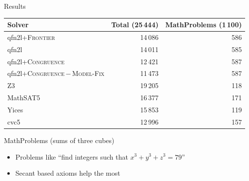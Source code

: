 \documentclass[11pt]{beamer}
\newcommand{\solver}{\textsf{qfn2l}}
\begin{document}
\begin{frame}{Results}
	\begin{center}
		\footnotesize
		\renewcommand{\arraystretch}{1.15}
		\begin{tabular}{lrr}
			\toprule
			\textbf{Solver}               & \textbf{Total} (25\,444) & \textbf{MathProblems} (1\,100) \\
			\midrule
			{\solver{}+\textsc{Frontier}} & {14\,086}                & {586}                          \\
			{\solver}                     & {14\,011}                & {585}                          \\
			{\solver{}+\textsc{Congruence}}   & {12\,421}                & {587}                          \\
			{\solver{}$+$\textsc{Congruence}\,$-$\,\textsc{Model-Fix}}
			                              & {11\,473}                & {587}                          \\
			\midrule
			Z3                            & 19\,205                  & 118                            \\
			MathSAT5                      & 16\,377                  & 171                            \\
			Yices                         & 15\,853                  & 119                            \\
			cvc5                          & 12\,996                  & 157                            \\
			\bottomrule
		\end{tabular}
	\end{center}
	\alert{MathProblems} (sums of three cubes)
	\begin{itemize}
		\item Problems like ``find integers such that $x^3 + y^3 + z^3 = 79$''
		\item Secant based axioms help the most
	\end{itemize}
\end{frame}
\end{document}

